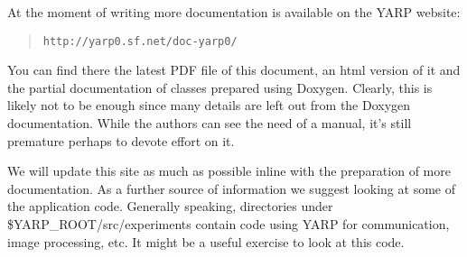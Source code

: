 At the moment of writing more documentation is available on the YARP website:

\begin{quote}
{\tt http://yarp0.sf.net/doc-yarp0/}
\end{quote}

You can find there the latest PDF file of this document, an html version of it and the partial documentation of classes prepared using Doxygen. Clearly, this is likely not to be enough since many details are left out from the Doxygen documentation. While the authors can see the need of a manual, it's still premature perhaps to devote effort on it.

We will update this site as much as possible inline with the preparation of more documentation. As a further source of information we suggest looking at some of the application code. Generally speaking, directories under \$YARP\_ROOT/src/experiments contain code using YARP for communication, image processing, etc. It might be a useful exercise to look at this code.